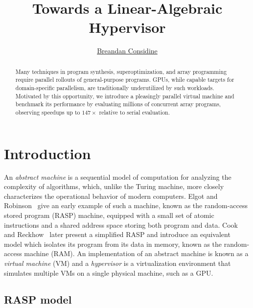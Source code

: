 \documentclass[sigplan,nonacm]{acmart}\settopmatter{printfolios=false,printccs=false,printacmref=false}
\begin{document}
\author{\href{bre@ndan.co}{Breandan Considine}}

\title{Towards a Linear-Algebraic Hypervisor}

\begin{abstract}
  Many techniques in program synthesis, superoptimization, and array programming require parallel rollouts of general-purpose programs. GPUs, while capable targets for domain-specific parallelism, are traditionally underutilized by such workloads. Motivated by this opportunity, we introduce a pleasingly parallel virtual machine and benchmark its performance by evaluating millions of concurrent array programs, observing speedups up to $147\times$ relative to serial evaluation.
\end{abstract}

\maketitle

\section{Introduction}

An \textit{abstract machine} is a sequential model of computation for analyzing the complexity of algorithms, which, unlike the Turing machine, more closely characterizes the operational behavior of modern computers. Elgot and Robinson~\cite{elgot1964random} give an early example of such a machine, known as the random-access stored program (RASP) machine, equipped with a small set of atomic instructions and a shared address space storing both program and data. Cook and Reckhow~\cite{cook1972time} later present a simplified RASP and introduce an equivalent model which isolates its program from its data in memory, known as the random-access machine (RAM). An implementation of an abstract machine is known as a \textit{virtual machine} (VM) and a \textit{hypervisor} is a virtualization environment that simulates multiple VMs on a single physical machine, such as a GPU.

\subsection{RASP model}
\end{document}
